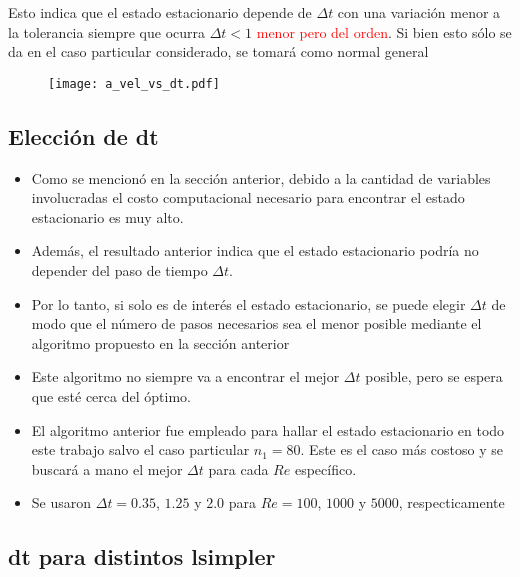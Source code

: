 \documentclass[aps,prb,twocolumn,superscriptaddress,floatfix,longbibliography,10pt]{revtex4-2}
\newif\ifptitle
\newif\ifpnumber
\newcounter{para}
\newcommand\ptitle[1]{\par\refstepcounter{para}
{\ifpnumber{\noindent\textcolor{lightgray}{\textbf{\thepara}}\indent}\fi}
{\ifptitle{\textbf{[{#1}]}}\fi}}
\begin{document}
Esto indica que el estado estacionario depende de $\Delta t$ con una variación menor a la tolerancia siempre que ocurra $\Delta t < 1$ \textcolor{red}{menor pero del orden}. Si bien esto sólo se da en el caso particular considerado, se tomará como normal general



\begin{figure}[h]
  \texttt{[image: a\_vel\_vs\_dt.pdf]}
  \caption{}
   \label{fig:a_vel_vs_dt}
\end{figure}



\subsection{Elección de dt}

\begin{itemize}
  \item Como se mencionó en la sección anterior, debido a la cantidad de variables involucradas el costo computacional necesario para encontrar el estado estacionario es muy alto.
  \item Además, el resultado anterior indica que el estado estacionario podría no depender del paso de tiempo $\Delta t$.
  \item Por lo tanto, si solo es de interés el estado estacionario, se puede elegir $\Delta t$ de modo que el número de pasos necesarios sea el menor posible mediante el algoritmo propuesto en la sección anterior
\end{itemize}

\ptitle{Para qué se usó el algoritmo anterior}
\begin{itemize}
  \item Este algoritmo no siempre va a encontrar el mejor $\Delta t$ posible, pero se espera que esté cerca del óptimo.
  \item El algoritmo anterior fue empleado para hallar el estado estacionario en todo este trabajo salvo el caso particular $n_1 = 80$. Este es el caso más costoso y se buscará a mano el mejor $\Delta t$ para cada $Re$ específico.
  \item Se usaron $\Delta t = 0.35$, $1.25$ y $2.0$ para $Re = 100$, $1000$ y $5000$, respecticamente
\end{itemize}

\subsection{dt para distintos lsimpler}
\end{document}
